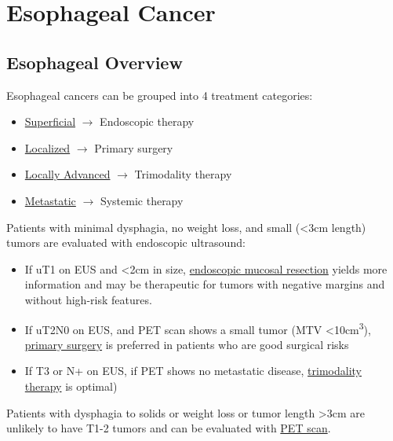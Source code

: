 \documentclass[
]{book}
\providecommand{\tightlist}{%
  \setlength{\itemsep}{0pt}\setlength{\parskip}{0pt}}
\begin{document}
\hypertarget{part-esophageal-cancer}{%
\part*{Esophageal Cancer}\label{part-esophageal-cancer}}

\hypertarget{EsoIntro}{%
\chapter{Esophageal Overview}\label{EsoIntro}}

Esophageal cancers can be grouped into 4 treatment categories:

\begin{itemize}
\tightlist
\item
  \protect\hyperlink{superficial}{Superficial} \(\rightarrow\) Endoscopic therapy
\item
  \protect\hyperlink{localized}{Localized} \(\rightarrow\) Primary surgery
\item
  \protect\hyperlink{locally_advanced}{Locally Advanced} \(\rightarrow\) Trimodality therapy
\item
  \protect\hyperlink{metastatic}{Metastatic} \(\rightarrow\) Systemic therapy
\end{itemize}

Patients with minimal dysphagia, no weight loss, and small (\textless3cm length) tumors are evaluated with endoscopic ultrasound:

\begin{itemize}
\tightlist
\item
  If uT1 on EUS and \textless2cm in size, \protect\hyperlink{emr}{endoscopic mucosal resection} yields more information and may be therapeutic for tumors with negative margins and without high-risk features.
\item
  If uT2N0 on EUS, and PET scan shows a small tumor (MTV \textless10cm\textsuperscript{3}), \protect\hyperlink{primary_surgery}{primary surgery} is preferred in patients who are good surgical risks
\item
  If T3 or N+ on EUS, if PET shows no metastatic disease, \protect\hyperlink{trimodality}{trimodality therapy} is optimal)
\end{itemize}

Patients with dysphagia to solids or weight loss or tumor length \textgreater3cm are unlikely to have T1-2 tumors and can be evaluated with \protect\hyperlink{pet}{PET scan}.
\end{document}
